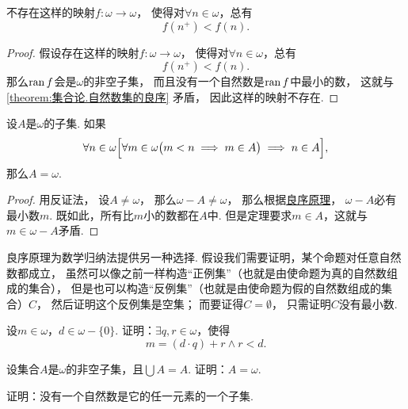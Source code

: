 \begin{theorem}
不存在这样的映射\(f\colon\omega\to\omega\)，
使得对\(\forall n \in \omega\)，总有\[
	f(n^+) < f(n).
\]
\begin{proof}
假设存在这样的映射\(f\colon\omega\to\omega\)，
使得对\(\forall n \in \omega\)，总有\[
	f(n^+) < f(n).
\]
那么\(\operatorname{ran} f\)会是\(\omega\)的非空子集，
而且没有一个自然数是\(\operatorname{ran} f\)中最小的数，
这就与\cref{theorem:集合论.自然数集的良序} 矛盾，
因此这样的映射不存在.
\end{proof}
\end{theorem}

\begin{theorem}[强归纳原理]\label{theorem:集合论.归纳原理2}
设\(A\)是\(\omega\)的子集.
如果\[
	\forall n \in \omega \Bigl[
		\forall m \in \omega \bigl( m < n \implies m \in A \bigr)
		\implies
		n \in A
	\Bigr],
\]
那么\(A = \omega\).
\begin{proof}
用反证法，
设\(A \neq \omega\)，
那么\(\omega - A \neq \omega\)，
那么根据\hyperref[theorem:集合论.自然数集的良序]{良序原理}，
\(\omega - A\)必有最小数\(m\).
既如此，所有比\(m\)小的数都在\(A\)中.
但是定理要求\(m \in A\)，这就与\(m \in \omega - A\)矛盾.
\end{proof}
\end{theorem}

良序原理为数学归纳法提供另一种选择.
假设我们需要证明，某个命题对任意自然数都成立，
虽然可以像之前一样构造“正例集”（也就是由使命题为真的自然数组成的集合），
但是也可以构造“反例集”（也就是由使命题为假的自然数组成的集合）\(C\)，
然后证明这个反例集是空集；
而要证得\(C = \emptyset\)，
只需证明\(C\)没有最小数.

\begin{example}
设\(m\in\omega\)，\(d\in\omega-\{0\}\).
证明：\(\exists q,r\in\omega\)，使得\[
	m=(d \cdot q)+r
	\land
	r<d.
\]
\end{example}

\begin{example}
设集合\(A\)是\(\omega\)的非空子集，且\(\bigcup A = A\).
证明：\(A=\omega\).
\end{example}

\begin{example}
证明：没有一个自然数是它的任一元素的一个子集.
\end{example}

